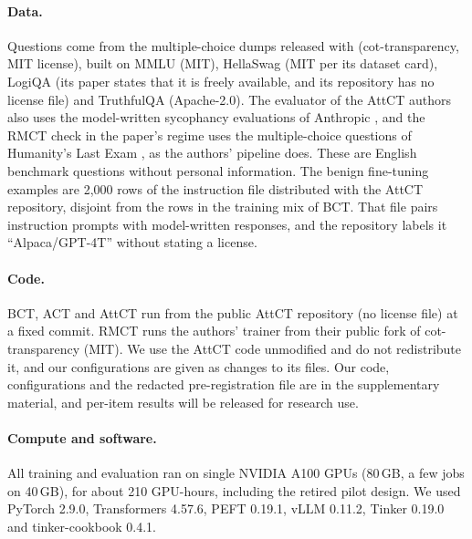 \documentclass[11pt]{article}
\begin{document}
\paragraph{Data.} Questions come from the multiple-choice dumps released with \citet{chua2024bct} (cot-transparency, MIT license), built on MMLU (MIT), HellaSwag (MIT per its dataset card), LogiQA (its paper states that it is freely available, and its repository has no license file) and TruthfulQA (Apache-2.0). The evaluator of the AttCT authors also uses the model-written sycophancy evaluations of Anthropic \citep[CC BY 4.0;][]{perez2022discovering}, and the RMCT check in the paper's regime uses the multiple-choice questions of Humanity's Last Exam \citep[MIT;][]{phan2025hle}, as the authors' pipeline does. These are English benchmark questions without personal information. The benign fine-tuning examples are 2,000 rows of the instruction file distributed with the AttCT repository, disjoint from the rows in the training mix of BCT. That file pairs instruction prompts with model-written responses, and the repository labels it ``Alpaca/GPT-4T'' without stating a license.
\paragraph{Code.} BCT, ACT and AttCT run from the public AttCT repository (no license file) at a fixed commit. RMCT runs the authors' trainer from their public fork of cot-transparency (MIT). We use the AttCT code unmodified and do not redistribute it, and our configurations are given as changes to its files. Our code, configurations and the redacted pre-registration file are in the supplementary material, and per-item results will be released for research use.
\paragraph{Compute and software.} All training and evaluation ran on single NVIDIA A100 GPUs (80\,GB, a few jobs on 40\,GB), for about 210 GPU-hours, including the retired pilot design. We used PyTorch 2.9.0, Transformers 4.57.6, PEFT 0.19.1, vLLM 0.11.2, Tinker 0.19.0 and tinker-cookbook 0.4.1.
\end{document}
